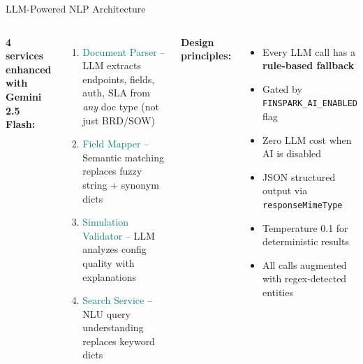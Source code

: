 \documentclass[aspectratio=169,11pt]{beamer}
\begin{document}
\begin{frame}{LLM-Powered NLP Architecture}
\begin{columns}[T]
\textbf{4 services enhanced with Gemini 2.5 Flash:}
\begin{enumerate}
\item \textcolor{teal}{Document Parser} -- LLM extracts endpoints, fields, auth, SLA from \emph{any} doc type (not just BRD/SOW)
\item \textcolor{teal}{Field Mapper} -- Semantic matching replaces fuzzy string + synonym dicts
\item \textcolor{teal}{Simulation Validator} -- LLM analyzes config quality with explanations
\item \textcolor{teal}{Search Service} -- NLU query understanding replaces keyword dicts
\end{enumerate}

\textbf{Design principles:}
\begin{itemize}
\item Every LLM call has a \textbf{rule-based fallback}
\item Gated by \texttt{FINSPARK\_AI\_ENABLED} flag
\item Zero LLM cost when AI is disabled
\item JSON structured output via \texttt{responseMimeType}
\item Temperature 0.1 for deterministic results
\item All calls augmented with regex-detected entities
\end{itemize}
\end{columns}
\end{frame}
\end{document}

